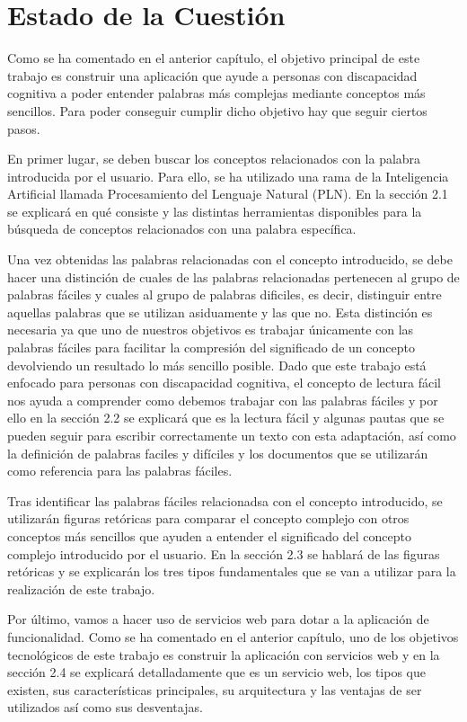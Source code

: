 \chapter{Estado de la Cuestión}
\label{cap:estadoDeLaCuestion}

Como se ha comentado en el anterior capítulo, el objetivo principal de este trabajo es construir una aplicación que ayude a personas con discapacidad cognitiva a poder entender palabras más complejas mediante conceptos más sencillos. Para poder conseguir cumplir dicho objetivo hay que seguir ciertos pasos.

En primer lugar, se deben buscar los conceptos relacionados con la palabra introducida por el usuario. Para ello, se ha utilizado una rama de la Inteligencia Artificial llamada Procesamiento del Lenguaje Natural (PLN). En la sección 2.1 se explicará en qué consiste y las distintas herramientas disponibles para la búsqueda de conceptos relacionados con una palabra específica.

Una vez obtenidas las palabras relacionadas con el concepto introducido, se debe hacer una distinción de cuales de las palabras relacionadas pertenecen al grupo de palabras fáciles y cuales al grupo de palabras dificiles, es decir, distinguir entre aquellas palabras que se utilizan asiduamente y las que no.
Esta distinción es necesaria ya que uno de nuestros objetivos es trabajar únicamente con las palabras fáciles para facilitar la compresión del significado de un concepto devolviendo un resultado lo más sencillo posible. Dado que este trabajo está enfocado para personas con discapacidad cognitiva, el concepto de lectura fácil nos ayuda a comprender como debemos trabajar con las palabras fáciles y por ello en la sección 2.2 se explicará que es la lectura fácil y algunas pautas que se pueden seguir para escribir correctamente un texto con esta adaptación, así como la definición de palabras faciles y difíciles y los documentos que se utilizarán como referencia para las palabras fáciles.

Tras identificar las palabras fáciles relacionadsa con el concepto introducido, se utilizarán figuras retóricas para comparar el concepto complejo con otros conceptos más sencillos que ayuden a entender el significado del concepto complejo introducido por el usuario. En la sección 2.3 se hablará de las figuras retóricas y se explicarán los tres tipos fundamentales que se van a utilizar para la realización de este trabajo. 

Por último, vamos a hacer uso de servicios web para dotar a la aplicación de funcionalidad. Como se ha comentado en el anterior capítulo, uno de los objetivos tecnológicos de este trabajo es construir la aplicación con servicios web y en la sección 2.4 se explicará detalladamente que es un servicio web, los tipos que existen, sus características principales, su arquitectura y las ventajas de ser utilizados así como sus desventajas.


